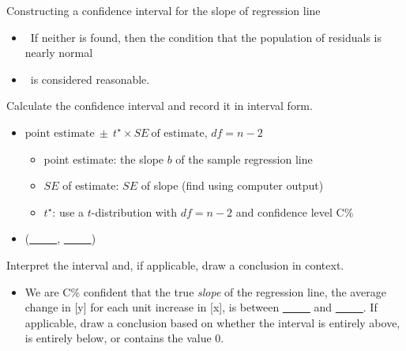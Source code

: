 \begin{onebox}{Constructing a confidence interval for the slope of regression line}
\begin{itemize}
\item[] \ \quad If neither is found, then the condition that the population of residuals is nearly normal 
\item[] \ \quad is considered reasonable.  
\end{itemize}
 Calculate the confidence interval and record it in interval form.
\begin{itemize}
\item[] $\text{point estimate}\ \pm\ t^{\star} \times SE\ \text{of estimate}$, \quad $df = n - 2$
\begin{itemize}											
\item[] point estimate: the slope $b$ of the sample regression line
\item[] $SE$ of estimate: $SE$ of slope (find using computer output)
\item[] $t^{\star}$: use a $t$-distribution with $df = n-2$ and confidence level C\%
\end{itemize}
\item[] (\underline{\ \ \ \ \ }, \underline{\ \ \ \ \ })
\end{itemize}
  Interpret the interval and, if applicable, draw a conclusion in context.\vspace{-1mm}
\begin{itemize}
\item[] We are C\%  confident that the true \emph{slope} of the regression line, the average change in [y] for each unit increase in [x], is between \underline{\ \ \ \ \ } and \underline{\ \ \ \ \ }. If applicable, draw a conclusion based on whether the interval is entirely above, is entirely below, or contains the value 0. 
\end{itemize}
\end{onebox}

